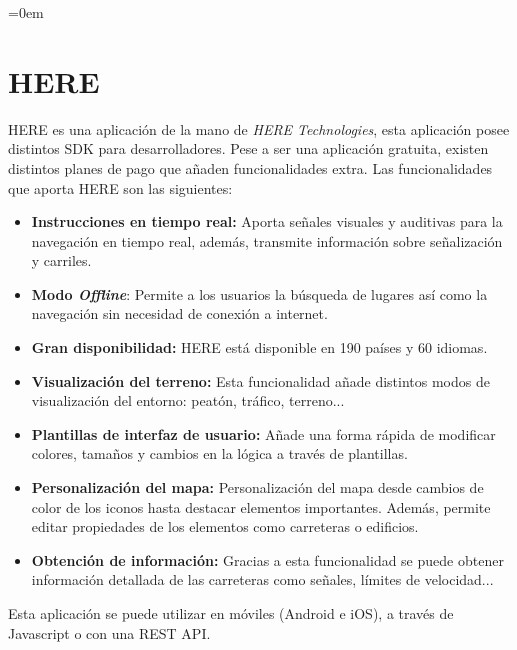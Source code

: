 \parindent=0em
\section{HERE}
\noindent

HERE es una aplicación de la mano de \textit{HERE Technologies}, esta aplicación posee distintos SDK para desarrolladores. Pese a ser una aplicación gratuita, existen distintos planes de pago que añaden funcionalidades extra. Las funcionalidades que aporta HERE son las siguientes:

\begin{itemize}
    \item \textbf{Instrucciones en tiempo real:} Aporta señales visuales y auditivas para la navegación en tiempo real, además, transmite información sobre señalización y carriles.
    
    \item \textbf{Modo \textit{Offline}}: Permite a los usuarios la búsqueda de lugares así como la navegación sin necesidad de conexión a internet.
    
    \item \textbf{Gran disponibilidad:} HERE está disponible en 190 países y 60 idiomas.
    
    \item \textbf{Visualización del terreno:} Esta funcionalidad añade distintos modos de visualización del entorno: peatón, tráfico, terreno...
    
    \item \textbf{Plantillas de interfaz de usuario:} Añade una forma rápida de modificar colores, tamaños y cambios en la lógica a través de plantillas.
    
    \item \textbf{Personalización del mapa:} Personalización del mapa desde cambios de color de los iconos hasta destacar elementos importantes. Además, permite editar propiedades de los elementos como carreteras o edificios.
    
    \item \textbf{Obtención de información:} Gracias a esta funcionalidad se puede obtener información detallada de las carreteras como señales, límites de velocidad...
\end{itemize}

Esta aplicación se puede utilizar en móviles (Android e iOS), a través de Javascript o con una REST API.


